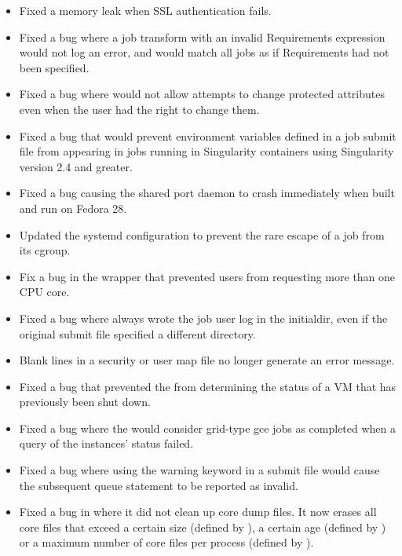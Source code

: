 \begin{itemize}

\item Fixed a memory leak when SSL authentication fails.

\item Fixed a bug where a job transform with an invalid Requirements expression would not log an
error, and would match all jobs as if Requirements had not been specified.

\item Fixed a bug where  would not allow attempts to change protected attributes even
when the user had the right to change them.

\item Fixed a bug that would prevent environment variables defined in a job
submit file from appearing in jobs running in Singularity containers using
Singularity version 2.4 and greater.

\item Fixed a bug causing the shared port daemon to crash immediately when
built and run on Fedora 28.

\item Updated the systemd configuration to prevent the rare escape of a job
from its cgroup.

\item Fix a bug in the  wrapper that prevented users from requesting more
than one CPU core.

\item Fixed a bug where  always wrote the job
user log in the initialdir, even if the original submit file specified
a different directory.

\item Blank lines in a security or user map file no longer generate
an error message.

\item Fixed a bug that prevented the  from determining
the status of a VM that has previously been shut down.

\item Fixed a bug where the  would consider grid-type
gce jobs as completed when a query of the instances' status failed.

\item Fixed a bug where using the warning keyword in a submit file would cause
the subsequent queue statement to be reported as invalid.

\item Fixed a bug in  where it did not clean up core dump files.
It now erases all core files that exceed a certain size (defined by 
), a certain age (defined by 
) or a maximum number of core files per
process (defined by ).

\end{itemize}

